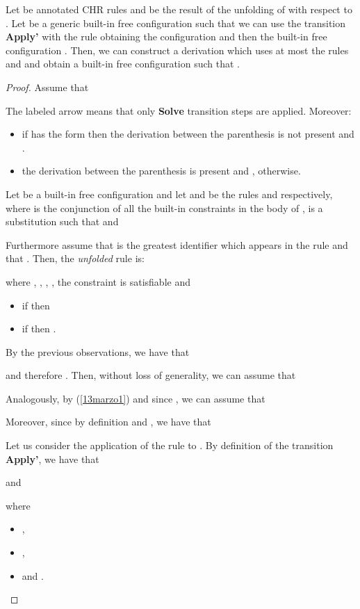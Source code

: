 \documentclass{tlp}
\begin{document}
\begin{proposition}\label{prop:servequality}
Let  be annotated CHR rules and   be the result
of the unfolding of  with respect to . Let  be a generic built-in free configuration such that we can use the transition \textbf{Apply'} with the rule  obtaining the configuration  and then the built-in free configuration . Then, we can construct a derivation which uses at most the rules  and  and obtain a built-in free configuration  such that .
\end{proposition}
\begin{proof}
Assume that


The labeled arrow  means that only {\bf Solve} transition steps are applied.
Moreover:
\begin{itemize}
           \item if  has the form
 then the derivation between the parenthesis is not present and .
           \item the derivation between the parenthesis is present and , otherwise.
         \end{itemize}
Let   be a built-in free configuration
and let  and  be the rules
 and
 respectively,
where  is the conjunction of all the built-in constraints in the body
of ,  is a substitution such that  and

Furthermore assume that  is the greatest identifier which appears in the
rule  and that .
Then, the \emph{unfolded} rule  is:

where ,
, 
, , the
constraint  is satisfiable and
\begin{itemize}
    \item if  then 
    \item if  then .
    \end{itemize}

By the previous observations, we have that
    
and therefore . Then, without loss of generality, we can assume that
    
Analogously, by (\ref{13marzo1}) and since , we can assume that
 



Moreover, since by definition  and , we have that
    
Let us consider the application of the rule  to . By definition of the transition \textbf{Apply'}, we have that

and

 \noindent
 where
 \begin{itemize}
   \item ,
   \item ,
   \item   and
     .
 \end{itemize}


\end{proof}
\end{document}

